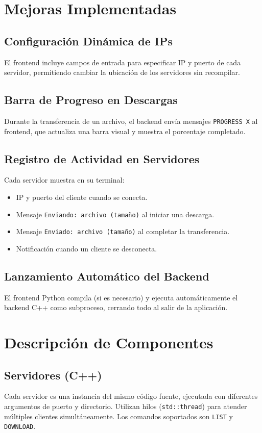 \documentclass[12pt]{article}
\begin{document}
\section{Mejoras Implementadas}

\subsection{Configuración Dinámica de IPs}
El frontend incluye campos de entrada para especificar IP y puerto de cada servidor, permitiendo cambiar la ubicación de los servidores sin recompilar.

\subsection{Barra de Progreso en Descargas}
Durante la transferencia de un archivo, el backend envía mensajes \texttt{PROGRESS X} al frontend, que actualiza una barra visual y muestra el porcentaje completado.

\subsection{Registro de Actividad en Servidores}
Cada servidor muestra en su terminal:
\begin{itemize}
    \item IP y puerto del cliente cuando se conecta.
    \item Mensaje \texttt{Enviando: archivo (tamaño)} al iniciar una descarga.
    \item Mensaje \texttt{Enviado: archivo (tamaño)} al completar la transferencia.
    \item Notificación cuando un cliente se desconecta.
\end{itemize}

\subsection{Lanzamiento Automático del Backend}
El frontend Python compila (si es necesario) y ejecuta automáticamente el backend C++ como subproceso, cerrando todo al salir de la aplicación.

\section{Descripción de Componentes}

\subsection{Servidores (C++)}
Cada servidor es una instancia del mismo código fuente, ejecutada con diferentes argumentos de puerto y directorio. Utilizan hilos (\texttt{std::thread}) para atender múltiples clientes simultáneamente. Los comandos soportados son \texttt{LIST} y \texttt{DOWNLOAD}.
\end{document}

